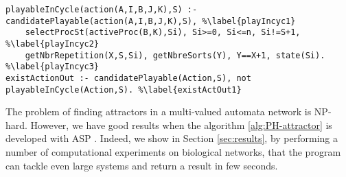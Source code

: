 \begin{lstlisting}
playableInCycle(action(A,I,B,J,K),S) :- candidatePlayable(action(A,I,B,J,K),S), %\label{playIncyc1}
	selectProcSt(activeProc(B,K),Si), Si>=0, Si<=n, Si!=S+1, %\label{playIncyc2}
	getNbrRepetition(X,S,Si), getNbreSorts(Y), Y==X+1, state(Si). %\label{playIncyc3}
existActionOut :- candidatePlayable(Action,S), not playableInCycle(Action,S). %\label{existActOut1}
\end{lstlisting}

The problem of finding attractors in a multi-valued automata network is NP-hard. However, we have good results when the algorithm \ref{alg:PH-attractor} is developed with ASP . Indeed, we show in Section \ref{sec:results}, by performing a number of computational experiments on biological networks, that the program can tackle even large systems and return a result in few seconds.

%
%
